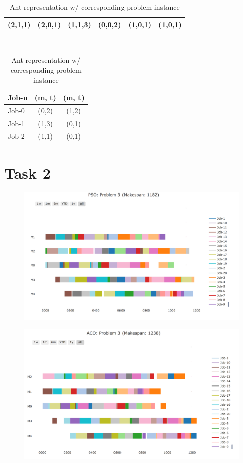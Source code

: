\documentclass{article}
\begin{document}
\begin{table}[h!]
  \centering
  \caption{Ant representation w/ corresponding problem instance}
\begin{tabular}{|l|l|l|l|l|l|}
\hline
(2,1,1) & (2,0,1) & (1,1,3) & (0,0,2) & (1,0,1) & (1,0,1) \\ \hline
\end{tabular} \\[2ex]
\begin{tabular}{|l|c|c|}
  \hline
Job-n & \multicolumn{1}{l|}{(m, t)} & \multicolumn{1}{l|}{(m, t)} \\ \hline
Job-0 & (0,2)                               & (1,2)                               \\ \hline
Job-1 & (1,3)                               & (0,1)                               \\ \hline
Job-2 & (1,1)                               & (0,1)                               \\ \hline
\end{tabular}
\label{ant}
\end{table}
\pagebreak
\section*{Task 2}
\begin{figure}[h]
  \centering
  \includegraphics[scale=.45]{../Results/PNG/pso_3.png}
\end{figure}
\vspace{-1cm}
\begin{figure}[h!]
  \centering
  \includegraphics[scale=.45]{../Results/PNG/aco_3.png}
\end{figure}
\end{document}
